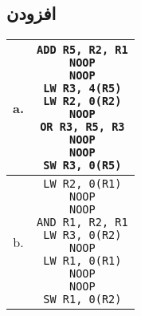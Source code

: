 \documentclass[11pt, dvipsnames, svgnames, x11names]{article}
\begin{document}
\subsection{افزودن }
\begin{latin}
\begin{table}[H]
\begin{center}
\begin{tabular}{|c|c|}
\hline
a. &
\makecell[l]{
\texttt{ADD R5, R2, R1} \\
\texttt{NOOP} \\
\texttt{NOOP} \\
\texttt{LW R3, 4(R5)} \\
\texttt{LW R2, 0(R2)} \\
\texttt{NOOP} \\
\texttt{OR R3, R5, R3} \\
\texttt{NOOP} \\
\texttt{NOOP} \\
\texttt{SW R3, 0(R5)}
} \\
\hline
b. &
\makecell[l]{
\texttt{LW R2, 0(R1)} \\
\texttt{NOOP} \\
\texttt{NOOP} \\
\texttt{AND R1, R2, R1} \\
\texttt{LW R3, 0(R2)} \\
\texttt{NOOP} \\
\texttt{LW R1, 0(R1)} \\
\texttt{NOOP} \\
\texttt{NOOP} \\
\texttt{SW R1, 0(R2)}
} \\
\hline
\end{tabular}
\end{center}
\end{table}
\end{latin}
\end{document}
